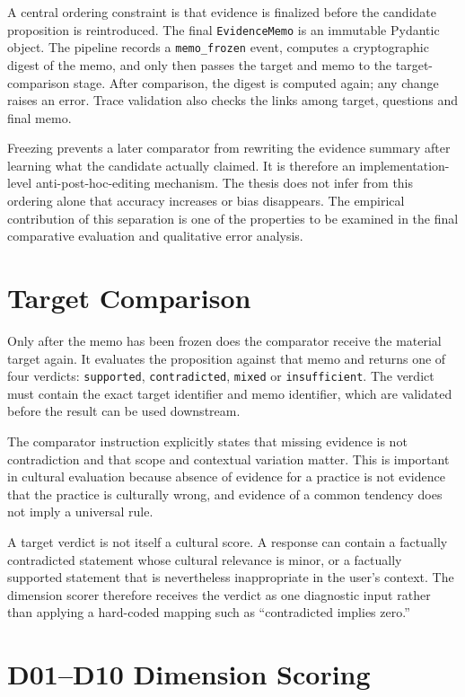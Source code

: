 A central ordering constraint is that evidence is finalized before the candidate proposition is reintroduced. The final \texttt{EvidenceMemo} is an immutable Pydantic object. The pipeline records a \texttt{memo\_frozen} event, computes a cryptographic digest of the memo, and only then passes the target and memo to the target-comparison stage. After comparison, the digest is computed again; any change raises an error. Trace validation also checks the links among target, questions and final memo.

Freezing prevents a later comparator from rewriting the evidence summary after learning what the candidate actually claimed. It is therefore an implementation-level anti-post-hoc-editing mechanism. The thesis does not infer from this ordering alone that accuracy increases or bias disappears. The empirical contribution of this separation is one of the properties to be examined in the final comparative evaluation and qualitative error analysis.

\section{Target Comparison}
\label{sec:target-comparison}

Only after the memo has been frozen does the comparator receive the material target again. It evaluates the proposition against that memo and returns one of four verdicts: \texttt{supported}, \texttt{contradicted}, \texttt{mixed} or \texttt{insufficient}. The verdict must contain the exact target identifier and memo identifier, which are validated before the result can be used downstream.

The comparator instruction explicitly states that missing evidence is not contradiction and that scope and contextual variation matter. This is important in cultural evaluation because absence of evidence for a practice is not evidence that the practice is culturally wrong, and evidence of a common tendency does not imply a universal rule.

A target verdict is not itself a cultural score. A response can contain a factually contradicted statement whose cultural relevance is minor, or a factually supported statement that is nevertheless inappropriate in the user's context. The dimension scorer therefore receives the verdict as one diagnostic input rather than applying a hard-coded mapping such as ``contradicted implies zero.''

\section{D01--D10 Dimension Scoring}
\label{sec:dimension-scoring}

